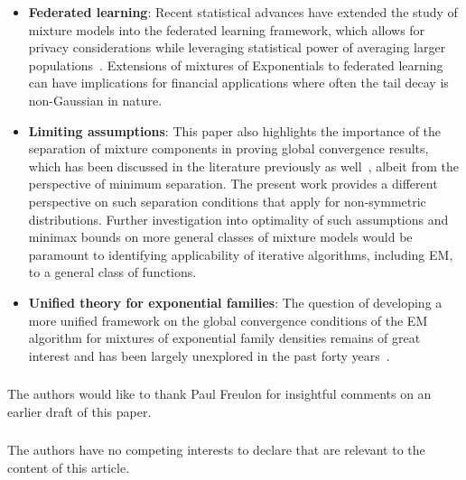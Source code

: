 \documentclass[runningheads]{llncs}
\begin{document}
\begin{itemize}
\item \textbf{Federated learning}: Recent statistical advances have extended the
  study of mixture models into the federated learning framework, which allows
  for privacy considerations while leveraging statistical power of averaging
  larger populations~\cite{tao2024convergence, reisizadeh2024mixture,
    wu2023personalized}. Extensions of mixtures of Exponentials to federated
  learning can have implications for financial applications where often the
  tail decay is non-Gaussian in nature.
\item \textbf{Limiting assumptions}: This paper also highlights the importance
  of the separation of mixture components in proving global convergence results,
  which has been discussed in the literature previously as
  well~\cite{daskalakis2017ten, wu2019randomly}, albeit from the perspective of
  minimum separation. The present work provides a different perspective on such
  separation conditions that apply for non-symmetric distributions. Further
  investigation into optimality of such assumptions and minimax bounds on more
  general classes of mixture models would be paramount to identifying
  applicability of iterative algorithms, including EM, to a general class of
  functions.
\item \textbf{Unified theory for exponential families}:
  The question of developing a more unified framework on the global convergence
  conditions of the EM algorithm for mixtures of exponential family densities
  remains of great interest and has been largely unexplored in the past forty
  years~\cite{wu1983convergence}.
\end{itemize}


\begin{credits}
\subsubsection{\ackname}
The authors would like to thank Paul Freulon for insightful comments on an
earlier draft of this paper.

\subsubsection{\discintname}
The authors have no competing interests to declare that are
relevant to the content of this article.
\end{credits}



\end{document}
